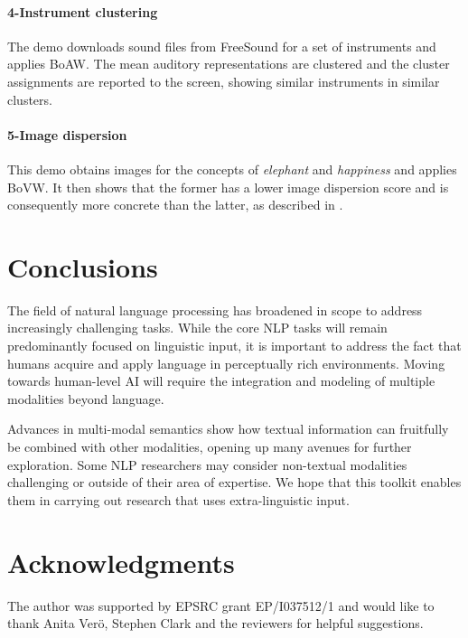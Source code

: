 \documentclass[11pt]{article}
\begin{document}
\paragraph{4-Instrument clustering} The demo downloads sound files from FreeSound for a set of instruments and applies BoAW. The mean auditory representations are clustered and the cluster assignments are reported to the screen, showing similar instruments in similar clusters.

\paragraph{5-Image dispersion} This demo obtains images for the concepts of \emph{elephant} and \emph{happiness} and applies BoVW. It then shows that the former has a lower image dispersion score and is consequently more concrete than the latter, as described in .

\section{Conclusions}

The field of natural language processing has broadened in scope to address increasingly challenging tasks. While the core NLP tasks will remain predominantly focused on linguistic input, it is important to address the fact that humans acquire and apply language in perceptually rich environments. Moving towards human-level AI will require the integration and modeling of multiple modalities beyond language.

Advances in multi-modal semantics show how textual information can fruitfully be combined with other modalities, opening up many avenues for further exploration. Some NLP researchers may consider non-textual modalities challenging or outside of their area of expertise. We hope that this toolkit enables them in carrying out research that uses extra-linguistic input.

\section*{Acknowledgments}

The author was supported by EPSRC grant EP/I037512/1 and would like to thank Anita Ver\"o, Stephen Clark and the reviewers for helpful suggestions.



\end{document}
